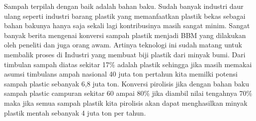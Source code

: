 \documentclass[
  letterpaper,
  DIV=11,
  numbers=noendperiod]{scrreprt}
\begin{document}
Sampah terpilah dengan baik adalah bahan baku. Sudah banyak industri
daur ulang seperti industri barang plastik yang memanfaatkan plastik
bekas sebagai bahan bakunya hanya saja sekali lagi kontribusinya masih
sangat minim. Sangat banyak berita mengenai konversi sampah plastik
menjadi BBM yang dilakukan oleh peneliti dan juga orang awam. Artinya
teknologi ini sudah matang untuk membalik proses di Industri yang
membuat biji plastik dari minyak bumi. Dari timbulan sampah diatas
sekitar 17\% adalah plastik sehingga jika masih memakai asumsi timbulans
ampah nasional 40 juta ton pertahun kita memilki potensi sampah plastic
sebanyak 6,8 juta ton. Konversi pirolisis jika dengan bahan baku sampah
plastic campuran sekitar 60 ampai 80\% jika diambil nilai tengahnya 70\%
maka jika semua sampah plastik kita pirolisis akan dapat menghasilkan
minyak plastik mentah sebanyak 4 juta ton per tahun.
\end{document}

